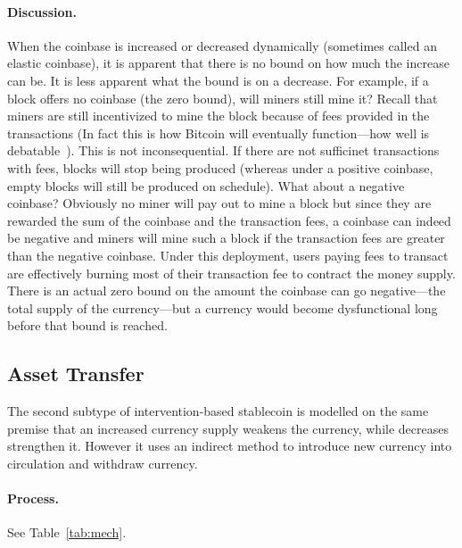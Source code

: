 \paragraph{Discussion.} When the coinbase is increased or decreased dynamically (sometimes called an elastic coinbase), it is apparent that there is no bound on how much the increase can be. It is less apparent what the bound is on a decrease. For example, if a block offers no coinbase (the zero bound), will miners still mine it? Recall that miners are still incentivized to mine the block because of fees provided in the transactions (In fact this is how Bitcoin will eventually function---how well is debatable~\cite{carlsten2016instability}). This is not inconsequential. If there are not sufficinet transactions with fees, blocks will stop being produced (whereas under a positive coinbase, empty blocks will still be produced on schedule). What about a negative coinbase? Obviously no miner will pay out to mine a block but since they are rewarded the sum of the coinbase and the transaction fees, a coinbase can indeed be negative and miners will mine such a block if the transaction fees are greater than the negative coinbase. Under this deployment, users paying fees to transact are effectively burning most of their transaction fee to contract the money supply. There is an actual zero bound on the amount the coinbase can go negative---the total supply of the currency---but a currency would become dysfunctional long before that bound is reached.




\subsection{Asset Transfer}
\label{sec:basecoin}

The second subtype of intervention-based stablecoin is modelled on the same premise that an increased currency supply weakens the currency, while decreases strengthen it. However it uses an indirect method to introduce new currency into circulation and withdraw currency. 

\paragraph{Process.} See Table~\ref{tab:mech}.

